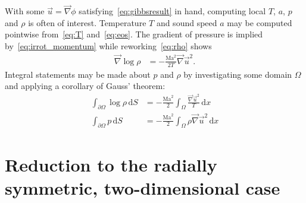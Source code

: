 \documentclass[letterpaper,11pt,nointlimits,reqno]{amsart}
\newcommand{\Mach}[1][]{\mbox{Ma}_{#1}}
\begin{document}
With some $\vec{u}=\vec{\nabla}\phi$ satisfying~\eqref{eq:gibbsresult} in hand,
computing local $T$, $a$, $p$ and $\rho$ is often of interest.  Temperature $T$
and sound speed $a$ may be computed pointwise from~\eqref{eq:T}
and~\eqref{eq:eos}. The gradient of pressure is implied
by~\eqref{eq:irrot_momentum} while reworking~\eqref{eq:rho} shows
\begin{align}
  \vec{\nabla}\log\rho
  &=
  -\frac{\Mach^2}{2T}\vec{\nabla}\vec{u}^2.
\end{align}
Integral statements may be made about $p$ and $\rho$ by investigating some
domain $\Omega$ and applying a corollary of Gauss' theorem:
\begin{align}
  \int_{\partial\Omega} \log\rho \, \mathrm{d}S
  &=
  - \frac{\Mach^2}{2}\int_{\Omega}
    \frac{\vec{\nabla}\vec{u}^2}{T} \, \mathrm{d}x
  \label{eq:logrho_nondim}
\\
  \int_{\partial\Omega} p \, \mathrm{d}S
  &=
  - \frac{\Mach^2}{2}\int_{\Omega} \rho \vec{\nabla}\vec{u}^2 \, \mathrm{d}x
  \label{eq:p_nondim}
\end{align}

\section{Reduction to the radially symmetric, two-dimensional case}
\end{document}
